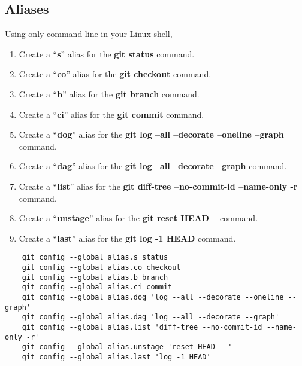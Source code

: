 \subsection{Aliases}  %

Using only command-line in your Linux shell,
\begin{enumerate}
    \item Create a ``\textbf{s}'' alias for the \textbf{git status} command.
    \item Create a ``\textbf{co}'' alias for the \textbf{git checkout} command.
    \item Create a ``\textbf{b}'' alias for the \textbf{git branch} command.
    \item Create a ``\textbf{ci}'' alias for the \textbf{git commit} command.
    \item Create a ``\textbf{dog}'' alias for the \textbf{git log --all --decorate --oneline --graph} command.
    \item Create a ``\textbf{dag}'' alias for the \textbf{git log --all --decorate --graph} command.
    \item Create a ``\textbf{list}'' alias for the \textbf{git diff-tree --no-commit-id --name-only -r} command.
    \item Create a ``\textbf{unstage}'' alias for the \textbf{git reset HEAD --} command.
    \item Create a ``\textbf{last}'' alias for the \textbf{git log -1 HEAD} command.
\end{enumerate}

\ifdefined\answer
\begin{verbatim}
    git config --global alias.s status
    git config --global alias.co checkout
    git config --global alias.b branch
    git config --global alias.ci commit
    git config --global alias.dog 'log --all --decorate --oneline --graph'
    git config --global alias.dag 'log --all --decorate --graph'
    git config --global alias.list 'diff-tree --no-commit-id --name-only -r'
    git config --global alias.unstage 'reset HEAD --'
    git config --global alias.last 'log -1 HEAD'
\end{verbatim}
\fi


